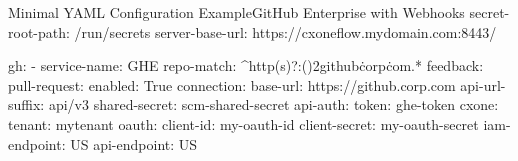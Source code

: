 \begin{code}{Minimal YAML Configuration Example}{GitHub Enterprise with Webhooks}{}
secret-root-path: /run/secrets
server-base-url: https://cxoneflow.mydomain.com:8443/

gh:
    - service-name: GHE
      repo-match: ^http(s)?:(\/){2}github\.corp\.com.*
      feedback:
        pull-request:
          enabled: True
      connection:
        base-url: https://github.corp.com
        api-url-suffix: api/v3
        shared-secret: scm-shared-secret
        api-auth:
          token: ghe-token
      cxone:
        tenant: mytenant
        oauth:
          client-id: my-oauth-id
          client-secret: my-oauth-secret
        iam-endpoint: US
        api-endpoint: US
\end{code}
  
